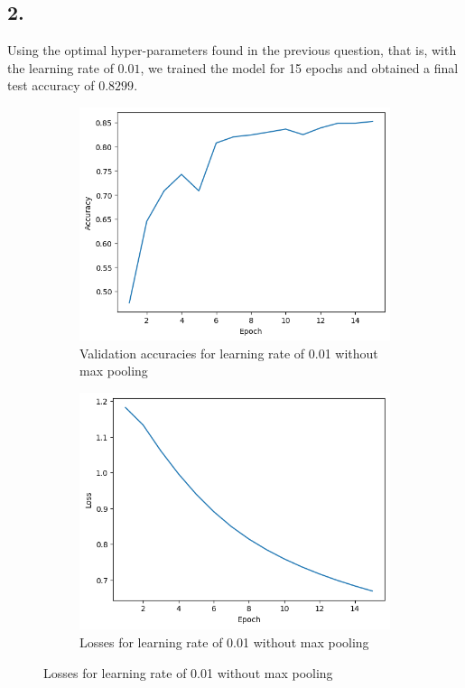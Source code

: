 \documentclass[11pt]{article}
\begin{document}
\subsection*{2.}

Using the optimal hyper-parameters found in the previous question, that is, with the learning rate of $0.01$, we trained the model for 15 epochs and obtained a final test accuracy of $0.8299$.

\begin{figure}[H]
    \hspace{0.025\linewidth}
    \begin{subfigure}{0.45\linewidth}
        \centering
        \includegraphics[width=\linewidth]{../data/q2/2/0.01.acc.png}
        \caption{Validation accuracies for learning rate of 0.01 without max pooling}
    \end{subfigure}
    \hspace{0.05\linewidth}
    \begin{subfigure}{0.45\linewidth}
        \centering
        \includegraphics[width=\linewidth]{../data/q2/2/0.01.loss.png}
        \caption{Losses for learning rate of 0.01 without max pooling}
    \end{subfigure}
\end{figure}
\end{document}
